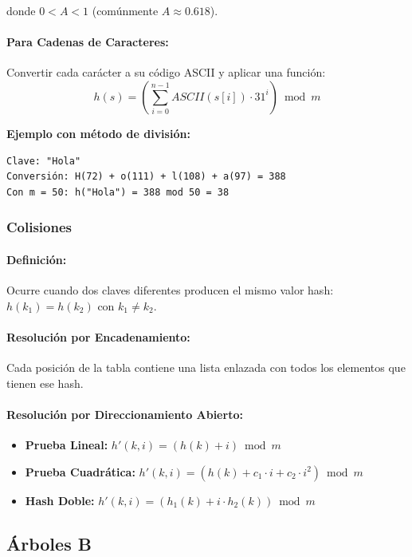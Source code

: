 \documentclass[12pt,a4paper]{article}
\begin{document}
donde $0 < A < 1$ (comúnmente $A \approx 0.618$).

\paragraph{Para Cadenas de Caracteres:}
Convertir cada carácter a su código ASCII y aplicar una función:
$$h(s) = \left(\sum_{i=0}^{n-1} ASCII(s[i]) \cdot 31^i\right) \bmod m$$

\textbf{Ejemplo con método de división:}
\begin{verbatim}
Clave: "Hola"
Conversión: H(72) + o(111) + l(108) + a(97) = 388
Con m = 50: h("Hola") = 388 mod 50 = 38
\end{verbatim}

\subsubsection{Colisiones}

\paragraph{Definición:}
Ocurre cuando dos claves diferentes producen el mismo valor hash: $h(k_1) = h(k_2)$ con $k_1 \neq k_2$.

\paragraph{Resolución por Encadenamiento:}
Cada posición de la tabla contiene una lista enlazada con todos los elementos que tienen ese hash.

\paragraph{Resolución por Direccionamiento Abierto:}
\begin{itemize}
    \item \textbf{Prueba Lineal:} $h'(k, i) = (h(k) + i) \bmod m$
    \item \textbf{Prueba Cuadrática:} $h'(k, i) = (h(k) + c_1 \cdot i + c_2 \cdot i^2) \bmod m$
    \item \textbf{Hash Doble:} $h'(k, i) = (h_1(k) + i \cdot h_2(k)) \bmod m$
\end{itemize}

\subsection{Árboles B}
\end{document}
